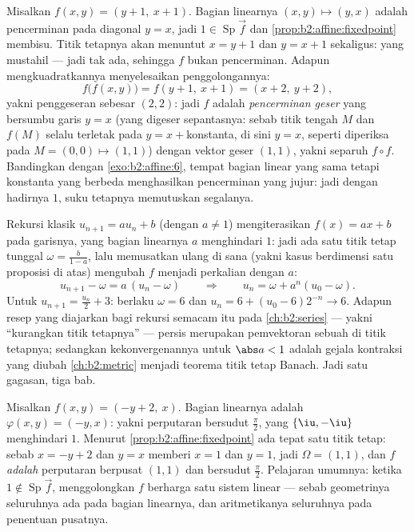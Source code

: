 \begin{example}\label{ex:b2:affine:glide}
Misalkan $f(x, y) = (y + 1,\ x + 1)$. Bagian linearnya $(x, y)
\mapsto (y, x)$ adalah pencerminan pada diagonal $y = x$, jadi
$1 \in \operatorname{Sp}\vec f$ dan
\cref{prop:b2:affine:fixedpoint} membisu. Titik tetapnya
akan menuntut $x = y + 1$ dan $y = x + 1$ sekaligus:
yang mustahil --- jadi tak ada, sehingga $f$ bukan pencerminan. Adapun mengkuadratkannya
menyelesaikan penggolongannya:
\[
f\bigl(f(x, y)\bigr) = f(y + 1,\ x + 1) = (x + 2,\ y + 2),
\]
yakni penggeseran sebesar $(2, 2)$: jadi $f$ adalah \emph{pencerminan
geser} yang bersumbu garis $y = x$ (yang digeser
sepantasnya: sebab titik tengah $M$ dan $f(M)$ selalu terletak pada
$y = x + {}$konstanta, di sini $y = x$, seperti diperiksa pada $M = (0,
0) \mapsto (1,1)$) dengan vektor geser $(1, 1)$, yakni separuh $f
\circ f$. Bandingkan dengan \cref{exo:b2:affine:6}, tempat bagian
linear yang sama tetapi konstanta yang berbeda menghasilkan pencerminan
yang jujur: jadi dengan hadirnya  $1$, suku tetapnya
memutuskan segalanya.
\end{example}

\begin{example}\label{ex:b2:affine:recursion}
Rekursi klasik $u_{n+1} = au_n + b$ (dengan $a \neq 1$)
mengiterasikan  $f(x) = ax + b$ pada garisnya, yang
bagian linearnya $a$ menghindari  $1$: jadi ada satu
titik tetap tunggal $\omega = \frac{b}{1-a}$, lalu memusatkan ulang di sana
(yakni kasus berdimensi satu proposisi di atas) mengubah
$f$ menjadi perkalian dengan $a$:
\[
u_{n+1} - \omega = a\,(u_n - \omega)
\qquad\Longrightarrow\qquad
u_n = \omega + a^n(u_0 - \omega) .
\]
Untuk $u_{n+1} = \frac{u_n}2 + 3$: berlaku $\omega = 6$ dan $u_n = 6 +
(u_0 - 6)2^{-n} \to 6$. Adapun resep yang diajarkan bagi rekursi
semacam itu pada \cref{ch:b2:series} --- yakni ``kurangkan titik
tetapnya'' --- persis merupakan pemvektoran sebuah 
di titik tetapnya; sedangkan kekonvergenannya untuk $\abs a < 1$ adalah
gejala kontraksi yang diubah \cref{ch:b2:metric} menjadi
teorema titik tetap Banach. Jadi satu gagasan, tiga bab.
\end{example}

\begin{example}\label{ex:b2:affine:rotationcenter}
Misalkan $f(x, y) = (-y + 2,\ x)$. Bagian linearnya adalah
$\varphi(x, y) = (-y, x)$: yakni perputaran bersudut $\frac\pi2$,
yang  $\{\iu, -\iu\}$ menghindari $1$. Menurut
\cref{prop:b2:affine:fixedpoint} ada tepat satu titik
tetap: sebab $x = -y + 2$ dan $y = x$ memberi $x = 1$ dan $y = 1$, jadi
$\Omega = (1, 1)$, dan $f$ \emph{adalah} perputaran berpusat
$(1, 1)$ dan bersudut $\frac\pi2$. Pelajaran umumnya: ketika $1
\notin \operatorname{Sp}\vec f$, menggolongkan $f$ berharga satu
sistem linear --- sebab geometrinya seluruhnya ada pada bagian linearnya,
dan aritmetikanya seluruhnya pada penentuan pusatnya.
\end{example}

